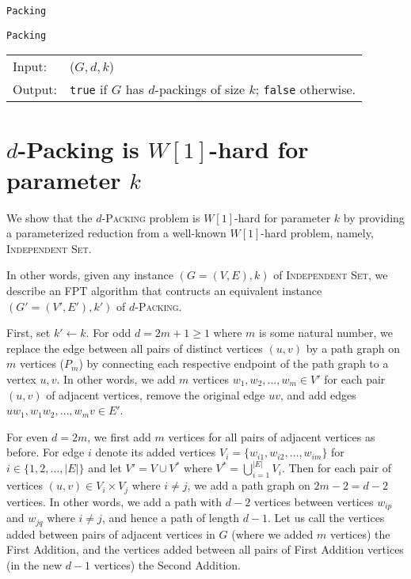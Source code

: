\documentclass[12pt, a4paper]{article}
\theoremstyle{definition}
\newcommand{\n}{\\}
\begin{document}
\begin{algorithm}[H]
\caption{\texttt{Packing}}          %
\label{algo:packing} 
\texttt{Packing}\n
\begin{tabular}{l l}
 Input:  & ($G, d, k$) \n
 Output: & \texttt{true} if $G$ has $d$-packings of size $k$; \texttt{false} otherwise. \n
\end{tabular}	

\end{algorithm}

\section{$d$-\sc Packing \textnormal{is $W[1]$-hard for parameter $k$}}


We show that the $d$-\textsc{Packing} problem is $W[1]$-hard for parameter $k$ by providing a parameterized reduction from a well-known $W[1]$-hard problem, namely, \textsc{Independent Set}.	

In other words, given any instance $(G=(V,E), k)$ of \textsc{Independent Set}, we describe an FPT algorithm that contructs an equivalent instance $(G'=(V',E'), k')$ of $d$-\textsc{Packing}.

First, set $k' \leftarrow k$. For odd $d=2m+1 \ge 1$ where $m$ is some natural number, we replace the edge between all pairs of distinct vertices $(u, v)$ by a path graph on $m$ vertices ($P_m$) by connecting each respective endpoint of the path graph to a vertex $u, v$. In other words, we add $m$ vertices $w_1, w_2, \dotsc, w_m \in V'$ for each pair $(u, v)$ of adjacent vertices, remove the original edge $uv$, and add edges $uw_1, w_1w_2, \dotsc, w_mv \in E'$.

For even $d=2m$, we first add $m$ vertices for all pairs of adjacent vertices as before. For edge $i$ denote its added vertices $V_{i} = \{w_{i1}, w_{i2}, \dotsc, w_{im}\}$ for $i \in \{1, 2, \dotsc, |E|\}$ and let $V' = V \cup V^{*}$ where $V^{*} = \bigcup_{i=1}^{|E|} V_i$. Then for each pair of vertices $(u, v) \in V_i \times V_j$ where $i \ne j$, we add a path graph on $2m-2 = d-2$ vertices. In other words, we add a path with $d-2$ vertices between vertices $w_{ip}$ and $w_{jq}$ where $i\ne j$, and hence a path of length $d-1$. Let us call the vertices added between pairs of adjacent vertices in $G$ (where we added $m$ vertices) the First Addition, and the vertices added between all pairs of First Addition vertices (in the new $d-1$ vertices) the Second Addition.
\end{document}
